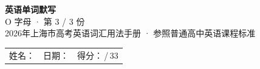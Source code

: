 \documentclass[10pt,a4paper]{article}
\begin{document}
\pagestyle{plain}

\begin{center}
{\LARGE\bfseries 英语单词默写}\\[0.22em]
{\large O 字母 · 第 3 / 3 份}\\[0.18em]
{\small 2026年上海市高考英语词汇用法手册 · 参照普通高中英语课程标准}
\end{center}

\vspace{0.25em}
\noindent\begin{tabular}{@{}p{}@{}p{}@{}p{}@{}}
姓名：\underline{\hspace{2.0cm}} & 日期：\underline{\hspace{2.0cm}} & 得分：\underline{\hspace{1.3cm}}\,/\,33 \\
\end{tabular}

\vspace{0.3em}

\vspace{0.08em}
\end{document}
